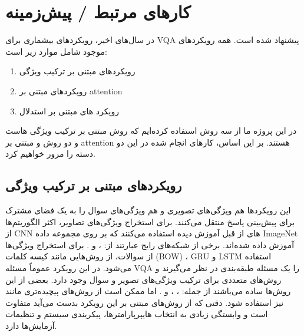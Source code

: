 \section{کار‌های مرتبط / پیش‌زمینه}
{
در سال‌های اخیر، رویکردهای بیشماری برای VQA پیشنهاد شده است. همه رویکردهای موجود شامل موارد زیر است:
	\begin{enumerate}
		\item رویکردهای مبتنی بر ترکیب ویژگی
		\item رویکردهای مبتنی بر attention
		\item رویکرد های مبتنی بر استدلال 
	\end{enumerate}
در این پروژه ما از سه روش استفاده کرده‌ایم که روش
	 مبتنی بر ترکیب ویژگی هاست و دو روش 
	و
	 مبتنی بر attention‌ هستند. بر این اساس، کارهای انجام شده در این دو دسته را مرور خواهیم کرد.
	 
	 \subsection{رویکردهای مبتنی بر ترکیب ویژگی}
	 {
	 	این رویکردها هم ویژگی‌های تصویری و هم ویژگی‌های سوال را به یک فضای مشترک برای پیش‌بینی پاسخ منتقل می‌کنند. برای استخراج ویژگی‌های تصاویر، اکثر الگوریتم‌ها از CNN های از قبل آموزش دیده استفاده می‌کنند که بر روی مجموعه داده ImageNet آموزش داده شده‌اند. برخی از شبکه‌های رایج عبارتند از: 
	 	\cite{szegedy2015going}
	 	 ،
	 	 \cite{he2016deep}
	 	 و 
	 	 \cite{simonyan2014very}.
	 	  برای استخراج ویژگی‌ها از سوالات، از روش‌هایی مانند کیسه کلمات (BOW) ، GRU
	 	  \cite{cho2014learning}
	 	   و LSTM 
	 	   \cite{hochreiter1997long}
	 	   استفاده می‌شود. در این رویکرد عموماً مسئله VQA را یک مسئله طبقه‌بندی در نظر می‌گیرند و روش‌های متعددی برای ترکیب ویژگی‌های تصویر و سوال وجود دارد. بعضی از این روش‌ها ساده می‌باشند از جمله:
	 	  ،
	 	  ،
	 	  و
	 	   .
	 	  اما ممکن است از روش‌های پیچیده‌تری مانند
	 	     نیز استفاده شود. دقتی که از روش‌های مبتنی بر این رویکرد بدست می‌آید متفاوت است و وابستگی زیادی به انتخاب هایپرپارامترها، پیکربندی سیستم و تنظیمات آزمایش‌ها دارد.
	 	  
	 }
 
}
